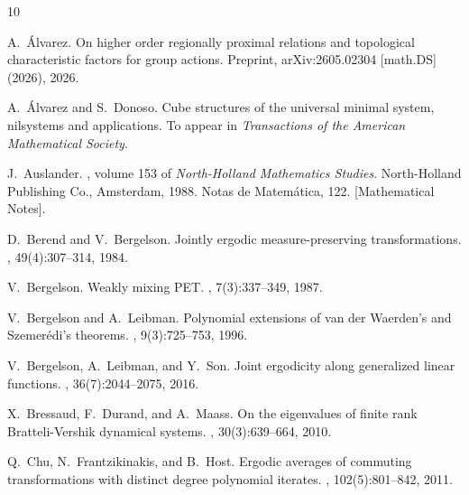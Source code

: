 \documentclass[11pt,reqno]{amsart}
\theoremstyle{definition}
\theoremstyle{remark}
\begin{document}

\begin{thebibliography}{10}

A.~{\'A}lvarez.
\newblock On higher order regionally proximal relations and topological characteristic factors for group actions.
\newblock Preprint, {arXiv}:2605.02304 [math.{DS}] (2026), 2026.

A.~{\'A}lvarez and S.~Donoso.
\newblock Cube structures of the universal minimal system, nilsystems and applications.
\newblock To appear in \emph{Transactions of the American Mathematical Society}.

J.~Auslander.
, volume 153 of {\em North-Holland Mathematics Studies}.
\newblock North-Holland Publishing Co., Amsterdam, 1988.
\newblock Notas de Matem\'{a}tica, 122. [Mathematical Notes].

D.~Berend and V.~Bergelson.
\newblock Jointly ergodic measure-preserving transformations.
, 49(4):307--314, 1984.

V.~Bergelson.
\newblock Weakly mixing {PET}.
, 7(3):337--349, 1987.

V.~Bergelson and A.~Leibman.
\newblock Polynomial extensions of van der {W}aerden's and {S}zemer\'edi's theorems.
, 9(3):725--753, 1996.

V.~Bergelson, A.~Leibman, and Y.~Son.
\newblock Joint ergodicity along generalized linear functions.
, 36(7):2044--2075, 2016.

X.~Bressaud, F.~Durand, and A.~Maass.
\newblock On the eigenvalues of finite rank {B}ratteli-{V}ershik dynamical systems.
, 30(3):639--664, 2010.

Q.~Chu, N.~Frantzikinakis, and B.~Host.
\newblock Ergodic averages of commuting transformations with distinct degree polynomial iterates.
, 102(5):801--842, 2011.


\end{thebibliography}
\end{document}
